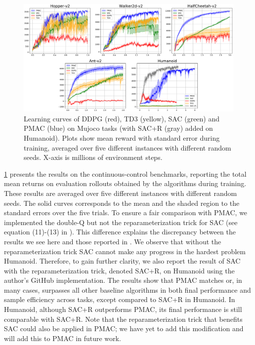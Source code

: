 \begin{figure}[t]
\begin{center}
\includegraphics[width=0.8\linewidth]{./mujoco-results.pdf}
\end{center}
\caption{
Learning curves of DDPG (red), TD3 (yellow), SAC (green) and PMAC (blue) on
Mujoco tasks (with SAC+R (gray) added on Humanoid).
Plots show mean reward with standard error during training,
averaged over five different instances with different random seeds.
X-axis is millions of environment steps.
}
\label{fig:result-mujoco} 
\end{figure}

\cref{fig:result-mujoco} presents the results on the 
continuous-control benchmarks, reporting the total mean returns
on evaluation rollouts obtained by the algorithms during training.
These
results are averaged over five different instances
with different random seeds.
The solid curves corresponds to the mean and the shaded region to the
standard errors over the five trials.
To ensure a fair comparison with PMAC, we implemented the double-Q
but not the reparameterization trick for SAC 
(see equation (11)-(13) in \citep{haarnoja2018soft}).
This difference explains the discrepancy between the results we see here
and those reported in \citep{haarnoja2018soft}.
We observe that without the reparameterization trick SAC cannot make
any progress in the hardest problem Humanoid.
Therefore, to gain further clarity, 
we also report the result of SAC with the reparameterization trick,
denoted SAC+R,
on Humanoid using the author's GitHub implementation.
The results show that PMAC matches or, in many cases, surpasses all other
baseline algorithms in both final performance and sample efficiency across
tasks, except compared to SAC+R in Humanoid.
In Humanoid, although SAC+R outperforms PMAC,
its final performance is still comparable with SAC+R.
Note that the reparameterization trick that benefits SAC
could also be applied in PMAC;
we have yet to add this modification and
will add this to PMAC in future work.


